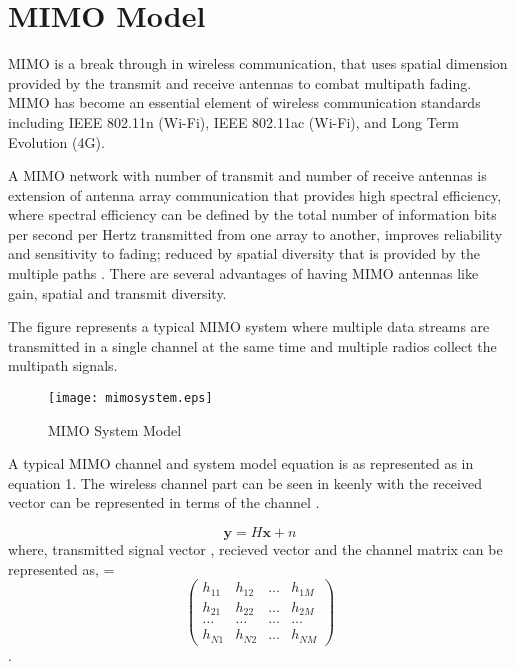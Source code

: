 
\section{MIMO Model}

\ac{MIMO} is a break through in wireless communication, that uses spatial dimension provided by the  transmit and  receive antennas to combat multipath fading. \ac{MIMO} has become an essential element of wireless communication standards including IEEE 802.11n (Wi-Fi), IEEE 802.11ac (Wi-Fi), and Long Term Evolution (4G).

A \acs{MIMO} network with  number of transmit and  number of receive antennas is extension of antenna array communication that provides high spectral efficiency, where spectral efficiency can be defined by the total number of information bits per second per Hertz transmitted from one array to another, improves reliability and sensitivity to fading; reduced by spatial diversity that is provided by the multiple paths . There are several advantages of having \acs{MIMO} antennas like gain, spatial and transmit diversity. 

The figure represents a typical \ac{MIMO} system where multiple data streams are  transmitted in a single channel at the same time and multiple radios collect the multipath signals.

\begin{figure}[h]
	\begin{center}
		\texttt{[image: mimosystem.eps]}
		\caption{MIMO System Model}
	\end{center}
\end{figure}


A typical \ac{MIMO} channel and system model equation is as represented as in equation 1. The wireless channel part can be seen in keenly with the received vector  can be represented in terms of the channel . 

\begin{equation}
\mathbf{y} = H \mathbf{x} + n
\label{bgmimo1_eqn}
\end{equation}
where, transmitted signal vector , recieved vector  and the channel matrix can be represented as,  =  \[ \left( \begin{array}{cccc} 
h_{11} & h_{12} & \dotsc & h_{1M} \\
h_{21} & h_{22} & \dotsc & h_{2M} \\
\dotsc & \dotsc & \dotsc & \dotsc \\
h_{N1} & h_{N2} & \dotsc & h_{NM} \end{array} \right)\].

